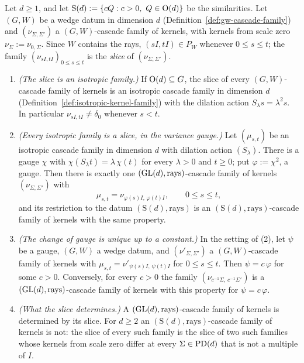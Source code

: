 \begin{proposition}\label{prop:isotropic-corner}
Let $d \ge 1$, and let $\mathrm S(d) := \{cQ : c > 0,\ Q \in \mathrm{O}(d)\}$ be the similarities. Let
$(G, W)$ be a wedge datum in dimension $d$ (Definition~\ref{def:gw-cascade-family}) and
$(\nu_{\Sigma,\Sigma'})$ a $(G, W)$-cascade family of kernels, with kernels from scale zero
$\nu_\Sigma := \nu_{0,\Sigma}$. Since $W$ contains the rays, $(sI, tI) \in P_W$ whenever
$0 \le s \le t$; the family $(\nu_{sI,tI})_{0 \le s \le t}$ is the \emph{slice} of
$(\nu_{\Sigma,\Sigma'})$.
\begin{enumerate}
\item \emph{(The slice is an isotropic family.)} If $\mathrm{O}(d) \subseteq G$, the slice of every
$(G, W)$-cascade family of kernels is an isotropic cascade family in dimension $d$
(Definition~\ref{def:isotropic-kernel-family}) with the dilation action $S_\lambda s = \lambda^2 s$. In
particular $\nu_{sI,tI} \ne \delta_0$ whenever $s < t$.
\item \emph{(Every isotropic family is a slice, in the variance gauge.)} Let $(\mu_{s,t})$ be an
isotropic cascade family in dimension $d$ with dilation action $(S_\lambda)$. There is a gauge
$\chi$ with $\chi(S_\lambda t) = \lambda\,\chi(t)$ for every $\lambda > 0$ and $t \ge 0$; put
$\varphi := \chi^2$, a gauge. Then there is exactly one $(\mathrm{GL}(d), \text{rays})$-cascade family of
kernels $(\nu_{\Sigma,\Sigma'})$ with
\[
  \mu_{s,t} = \nu_{\varphi(s)I,\,\varphi(t)I}, \qquad 0 \le s \le t ,
\]
and its restriction to the datum $(\mathrm S(d), \text{rays})$ is an $(\mathrm S(d), \text{rays})$-cascade family of kernels
with the same property.
\item \emph{(The change of gauge is unique up to a constant.)} In the setting of (2), let $\psi$ be
a gauge, $(G, W)$ a wedge datum, and $(\nu'_{\Sigma,\Sigma'})$ a
$(G, W)$-cascade family of kernels with $\mu_{s,t} = \nu'_{\psi(s)I,\,\psi(t)I}$ for
$0 \le s \le t$. Then $\psi = c\,\varphi$ for some $c > 0$. Conversely, for every $c > 0$ the family
$(\nu_{c^{-1}\Sigma,\,c^{-1}\Sigma'})$ is a $(\mathrm{GL}(d), \text{rays})$-cascade family of kernels with
this property for $\psi = c\,\varphi$.
\item \emph{(What the slice determines.)} A $(\mathrm{GL}(d), \text{rays})$-cascade family of kernels is
determined by its slice. For $d \ge 2$ an $(\mathrm S(d), \text{rays})$-cascade family of kernels
is not: the slice of every such family is the slice of two such families whose kernels from scale zero differ at every $\Sigma \in \mathrm{PD}(d)$ that is not a multiple of $I$.
\end{enumerate}
\end{proposition}

